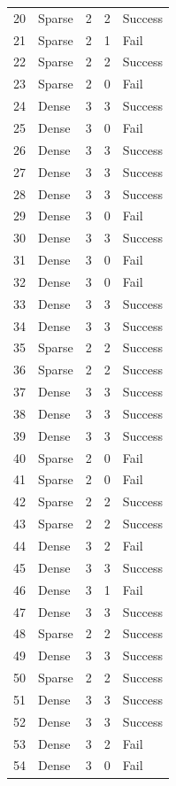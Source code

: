 \documentclass[../main.tex]{subfiles}
\begin{document}
\begin{center}
\begin{longtable}{|c|l|c|c|l|}
    20 & Sparse & 2 & 2 & Success \\
    21 & Sparse & 2 & 1 & Fail \\
    22 & Sparse & 2 & 2 & Success \\
    23 & Sparse & 2 & 0 & Fail \\
    24 & Dense & 3 & 3 & Success \\
    25 & Dense & 3 & 0 & Fail \\
    26 & Dense & 3 & 3 & Success \\
    27 & Dense & 3 & 3 & Success \\
    28 & Dense & 3 & 3 & Success \\
    29 & Dense & 3 & 0 & Fail \\
    30 & Dense & 3 & 3 & Success \\
    31 & Dense & 3 & 0 & Fail \\
    32 & Dense & 3 & 0 & Fail \\
    33 & Dense & 3 & 3 & Success \\
    34 & Dense & 3 & 3 & Success \\
    35 & Sparse & 2 & 2 & Success \\
    36 & Sparse & 2 & 2 & Success \\
    37 & Dense & 3 & 3 & Success \\
    38 & Dense & 3 & 3 & Success \\
    39 & Dense & 3 & 3 & Success \\
    40 & Sparse & 2 & 0 & Fail \\
    41 & Sparse & 2 & 0 & Fail \\
    42 & Sparse & 2 & 2 & Success \\
    43 & Sparse & 2 & 2 & Success \\
    44 & Dense & 3 & 2 & Fail \\
    45 & Dense & 3 & 3 & Success \\
    46 & Dense & 3 & 1 & Fail \\
    47 & Dense & 3 & 3 & Success \\
    48 & Sparse & 2 & 2 & Success \\
    49 & Dense & 3 & 3 & Success \\
    50 & Sparse & 2 & 2 & Success \\
    51 & Dense & 3 & 3 & Success \\
    52 & Dense & 3 & 3 & Success \\
    53 & Dense & 3 & 2 & Fail \\
    54 & Dense & 3 & 0 & Fail \\

\end{longtable}
\end{center}
\end{document}
